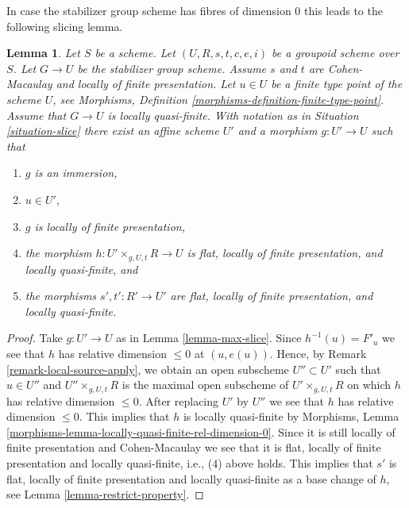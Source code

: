 \documentclass{stacks-project}
\theoremstyle{plain}
\newtheorem{lemma}[subsection]{Lemma}
\theoremstyle{definition}
\theoremstyle{remark}
\numberwithin{equation}{subsection}
\begin{document}
\noindent
In case the stabilizer group scheme has fibres of dimension 0
this leads to the following slicing lemma.

\begin{lemma}
\label{lemma-max-slice-quasi-finite}
Let $S$ be a scheme.
Let $(U, R, s, t, c, e, i)$ be a groupoid scheme over $S$.
Let $G \to U$ be the stabilizer group scheme.
Assume $s$ and $t$ are Cohen-Macaulay and locally of finite presentation.
Let $u \in U$ be a finite type point of the scheme $U$, see
Morphisms, Definition \ref{morphisms-definition-finite-type-point}.
Assume that $G \to U$ is locally quasi-finite.
With notation as in
Situation \ref{situation-slice}
there exist an affine scheme $U'$ and a morphism $g : U' \to U$ such that
\begin{enumerate}
\item $g$ is an immersion,
\item $u \in U'$,
\item $g$ is locally of finite presentation,
\item the morphism $h : U' \times_{g, U, t} R \longrightarrow U$
is flat, locally of finite presentation, and locally quasi-finite, and
\item the morphisms $s', t' : R' \to U'$ are flat,
locally of finite presentation, and locally quasi-finite.
\end{enumerate}
\end{lemma}

\begin{proof}
Take $g : U' \to U$ as in
Lemma \ref{lemma-max-slice}.
Since $h^{-1}(u) = F'_u$ we see that $h$ has relative dimension
$\leq 0$ at $(u, e(u))$. Hence, by
Remark \ref{remark-local-source-apply},
we obtain an open subscheme $U'' \subset U'$ such that
$u \in U''$ and $U'' \times_{g, U, t} R$ is the maximal open subscheme
of $U' \times_{g, U, t} R$ on which $h$ has relative dimension $\leq 0$.
After replacing $U'$ by $U''$ we see that $h$ has relative dimension $\leq 0$.
This implies that $h$ is locally quasi-finite by
Morphisms, Lemma \ref{morphisms-lemma-locally-quasi-finite-rel-dimension-0}.
Since it is still locally of finite presentation and Cohen-Macaulay we see
that it is flat, locally of finite presentation and locally quasi-finite,
i.e., (4) above holds. This implies that $s'$ is flat, locally of finite
presentation and locally quasi-finite as a base change of $h$, see
Lemma \ref{lemma-restrict-property}.
\end{proof}
\end{document}
